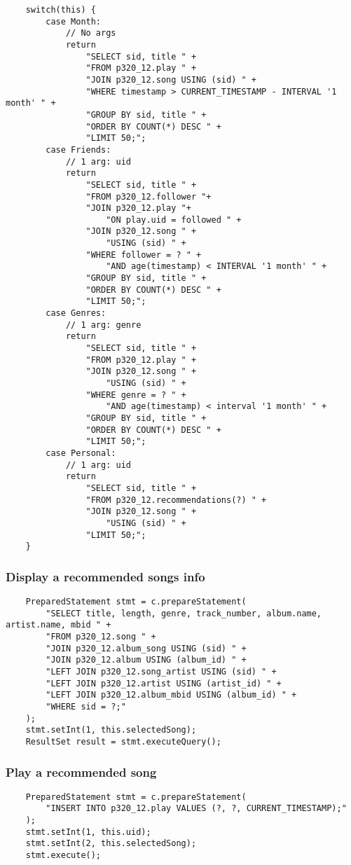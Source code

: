 \documentclass[12pt]{article}
\begin{document}
    \begin{lstlisting}
    switch(this) {
        case Month:
            // No args
            return
                "SELECT sid, title " +
                "FROM p320_12.play " +
                "JOIN p320_12.song USING (sid) " +
                "WHERE timestamp > CURRENT_TIMESTAMP - INTERVAL '1 month' " +
                "GROUP BY sid, title " +
                "ORDER BY COUNT(*) DESC " +
                "LIMIT 50;";
        case Friends:
            // 1 arg: uid
            return
                "SELECT sid, title " +
                "FROM p320_12.follower "+
                "JOIN p320_12.play "+
                    "ON play.uid = followed " +
                "JOIN p320_12.song " +
                    "USING (sid) " +
                "WHERE follower = ? " +
                    "AND age(timestamp) < INTERVAL '1 month' " +
                "GROUP BY sid, title " +
                "ORDER BY COUNT(*) DESC " +
                "LIMIT 50;";
        case Genres:
            // 1 arg: genre
            return
                "SELECT sid, title " +
                "FROM p320_12.play " +
                "JOIN p320_12.song " +
                    "USING (sid) " +
                "WHERE genre = ? " +
                    "AND age(timestamp) < interval '1 month' " +
                "GROUP BY sid, title " +
                "ORDER BY COUNT(*) DESC " +
                "LIMIT 50;";
        case Personal:
            // 1 arg: uid
            return
                "SELECT sid, title " +
                "FROM p320_12.recommendations(?) " +
                "JOIN p320_12.song " +
                    "USING (sid) " +
                "LIMIT 50;";
    }
    \end{lstlisting}

    \subsubsection{Display a recommended songs info}

    \begin{lstlisting}
    PreparedStatement stmt = c.prepareStatement(
        "SELECT title, length, genre, track_number, album.name, artist.name, mbid " +
        "FROM p320_12.song " +
        "JOIN p320_12.album_song USING (sid) " +
        "JOIN p320_12.album USING (album_id) " +
        "LEFT JOIN p320_12.song_artist USING (sid) " +
        "LEFT JOIN p320_12.artist USING (artist_id) " +
        "LEFT JOIN p320_12.album_mbid USING (album_id) " +
        "WHERE sid = ?;"
    );
    stmt.setInt(1, this.selectedSong);
    ResultSet result = stmt.executeQuery();
    \end{lstlisting}


    \subsubsection{Play a recommended song}

    \begin{lstlisting}
    PreparedStatement stmt = c.prepareStatement(
        "INSERT INTO p320_12.play VALUES (?, ?, CURRENT_TIMESTAMP);"
    );
    stmt.setInt(1, this.uid);
    stmt.setInt(2, this.selectedSong);
    stmt.execute();
    \end{lstlisting}
\end{document}
